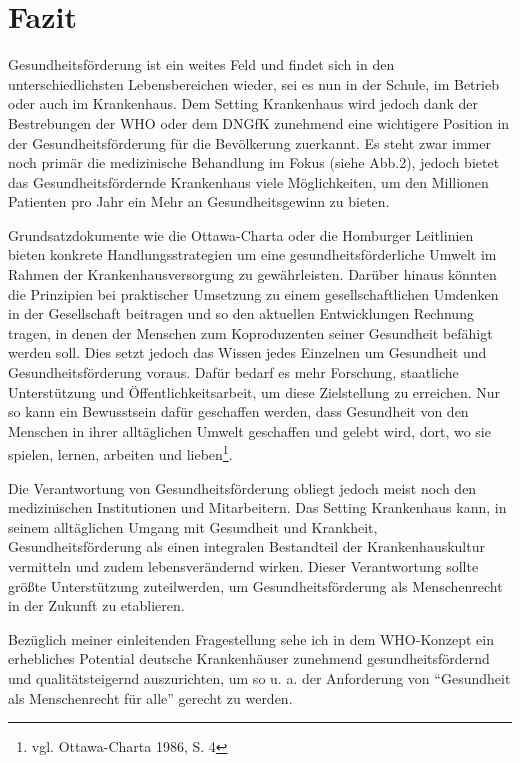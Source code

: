\section{Fazit}
\label{sec:Fazit}

Gesundheitsförderung ist ein weites Feld und findet sich in den unterschiedlichsten Lebensbereichen wieder, sei es nun in der Schule, im Betrieb oder auch im Krankenhaus. Dem Setting Krankenhaus wird jedoch dank der Bestrebungen der WHO oder dem DNGfK zunehmend eine wichtigere Position in der Gesundheitsförderung für die Bevölkerung zuerkannt. Es steht zwar immer noch primär die medizinische Behandlung im Fokus (siehe Abb.2), jedoch bietet das Gesundheitsfördernde Krankenhaus viele Möglichkeiten, um den Millionen Patienten pro Jahr ein Mehr an Gesundheitsgewinn zu bieten. 

Grundsatzdokumente wie die Ottawa-Charta oder die Homburger Leitlinien bieten konkrete Handlungsstrategien um eine gesundheitsförderliche Umwelt im Rahmen der Krankenhausversorgung zu gewährleisten. Darüber hinaus könnten die Prinzipien bei praktischer Umsetzung zu einem gesellschaftlichen Umdenken in der Gesellschaft beitragen und so den aktuellen Entwicklungen Rechnung tragen, in denen der Menschen zum Koproduzenten seiner Gesundheit befähigt werden soll. Dies setzt jedoch das Wissen jedes Einzelnen um Gesundheit und Gesundheitsförderung voraus. Dafür bedarf es mehr Forschung, staatliche Unterstützung und Öffentlichkeitsarbeit, um diese Zielstellung zu erreichen. Nur so kann ein Bewusstsein dafür geschaffen werden, dass Gesundheit von den Menschen in ihrer alltäglichen Umwelt geschaffen und gelebt wird, dort, wo sie spielen, lernen, arbeiten und lieben\footnote{vgl. Ottawa-Charta 1986, S. 4}. 

Die Verantwortung von Gesundheitsförderung obliegt jedoch meist noch den medizinischen Institutionen und Mitarbeitern. Das Setting Krankenhaus kann, in seinem alltäglichen Umgang mit Gesundheit und Krankheit, Gesundheitsförderung als einen integralen Bestandteil der Krankenhauskultur vermitteln und zudem lebensverändernd wirken. Dieser Verantwortung sollte größte Unterstützung zuteilwerden, um Gesundheitsförderung als Menschenrecht in der Zukunft zu etablieren.

Bezüglich meiner einleitenden Fragestellung sehe ich in dem WHO-Konzept ein erhebliches Potential deutsche Krankenhäuser zunehmend gesundheitsfördernd und qualitätsteigernd auszurichten, um so u. a. der Anforderung von "`Gesundheit als Menschenrecht für alle"' gerecht zu werden. 

